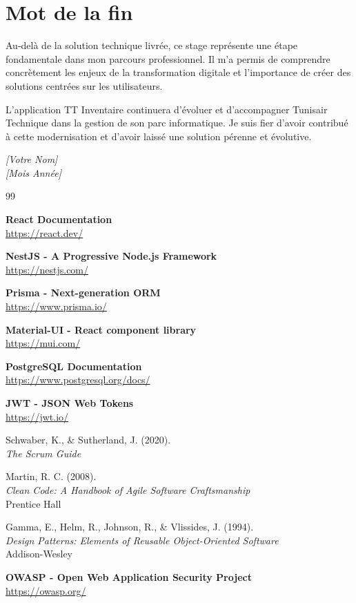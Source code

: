 \section*{Mot de la fin}

Au-delà de la solution technique livrée, ce stage représente une étape fondamentale dans mon parcours professionnel. Il m'a permis de comprendre concrètement les enjeux de la transformation digitale et l'importance de créer des solutions centrées sur les utilisateurs.

L'application TT Inventaire continuera d'évoluer et d'accompagner Tunisair Technique dans la gestion de son parc informatique. Je suis fier d'avoir contribué à cette modernisation et d'avoir laissé une solution pérenne et évolutive.

\vspace{1cm}

\begin{flushright}
\textit{[Votre Nom]}\\
\textit{[Mois Année]}
\end{flushright}

\begin{thebibliography}{99}

\textbf{React Documentation} \\
\url{https://react.dev/}

\textbf{NestJS - A Progressive Node.js Framework} \\
\url{https://nestjs.com/}

\textbf{Prisma - Next-generation ORM} \\
\url{https://www.prisma.io/}

\textbf{Material-UI - React component library} \\
\url{https://mui.com/}

\textbf{PostgreSQL Documentation} \\
\url{https://www.postgresql.org/docs/}

\textbf{JWT - JSON Web Tokens} \\
\url{https://jwt.io/}

Schwaber, K., \& Sutherland, J. (2020). \\
\textit{The Scrum Guide}

Martin, R. C. (2008). \\
\textit{Clean Code: A Handbook of Agile Software Craftsmanship} \\
Prentice Hall

Gamma, E., Helm, R., Johnson, R., \& Vlissides, J. (1994). \\
\textit{Design Patterns: Elements of Reusable Object-Oriented Software} \\
Addison-Wesley

\textbf{OWASP - Open Web Application Security Project} \\
\url{https://owasp.org/}

\end{thebibliography}

